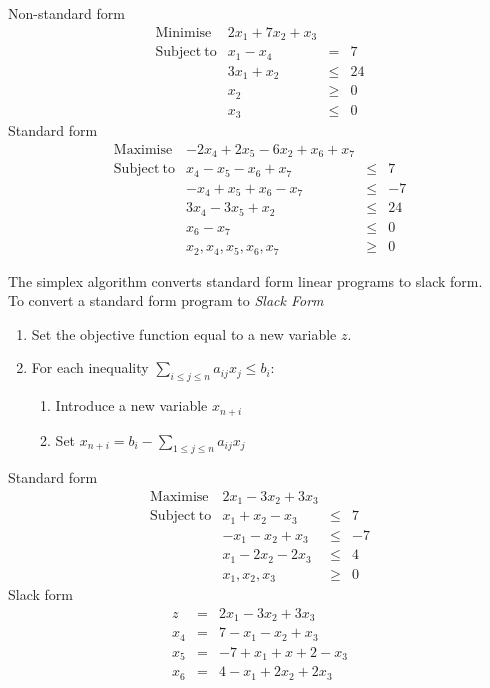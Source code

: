 \documentclass[11pt,a4paper]{article}
\begin{document}
\newpage
{}
Non-standard form\\
\[\begin{array}{rrcl}
\mathrm{Minimise}&2x_1+7x_2+x_3\\
\mathrm{Subject\ to}&x_1-x_4&=&7\\
&3x_1+x_2&\leq&24\\
&x_2&\geq&0\\
&x_3&\leq&0
\end{array}\]
Standard form\\
\[\begin{array}{rrcl}
\mathrm{Maximise}&-2x_4+2x_5-6x_2+x_6+x_7\\
\mathrm{Subject\ to}&x_4-x_5-x_6+x_7&\leq&7\\
&-x_4+x_5+x_6-x_7&\leq&-7\\
&3x_4-3x_5+x_2&\leq&24\\
&x_6-x_7&\leq&0\\
&x_2,x_4,x_5,x_6,x_7&\geq&0
\end{array}\]

The simplex algorithm converts standard form linear programs to slack form.\\
To convert a standard form program to \textit{Slack Form}
\begin{enumerate}[label=\roman*)]
  \item Set the objective function equal to a new variable $z$.
  \item For each inequality $\sum_{i\leq j\leq n}a_{ij}x_j\leq b_i$:
  \begin{enumerate}
    \item Introduce a new variable $x_{n+i}$
    \item Set $x_{n+i}=b_i-\sum_{1\leq j\leq n}a_{ij}x_j$
  \end{enumerate}
\end{enumerate}

Standard form\\
\[\begin{array}{rrcl}
\mathrm{Maximise}&2x_1-3x_2+3x_3\\
\mathrm{Subject\ to}&x_1+x_2-x_3&\leq&7\\
&-x_1-x_2+x_3&\leq&-7\\
&x_1-2x_2-2x_3&\leq&4\\
&x_1,x_2,x_3&\geq&0
\end{array}\]
Slack form\\
\[\begin{array}{rcl}
z&=&2x_1-3x_2+3x_3\\
x_4&=&7-x_1-x_2+x_3\\
x_5&=&-7+x_1+x+2-x_3\\
x_6&=&4-x_1+2x_2+2x_3
\end{array}\]
\end{document}
